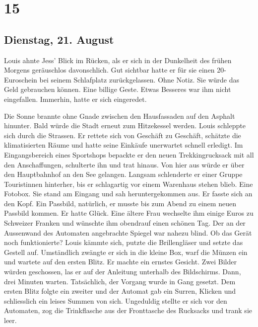 \chapter{15}

\section{Dienstag, 21. August}



Louis ahnte Jess’ Blick im Rücken, als er sich in der Dunkelheit des
frühen Morgens geräuschlos davonschlich.
Gut sichtbar hatte er für sie einen 20-Euroschein bei seinem Schlafplatz
zurückgelassen. Ohne Notiz. Sie würde das Geld gebrauchen können. Eine
billige Geste. Etwas Besseres war ihm nicht eingefallen. Immerhin, hatte
er sich eingeredet. 

\sectionbreak

Die Sonne brannte ohne Gnade zwischen den Hausfassaden auf den Asphalt hinunter. 
Bald würde die Stadt erneut zum Hitzekessel werden. Louis schleppte sich durch die Strassen. Er rettete sich von Geschäft zu Geschäft, schätzte die klimatisierten Räume und hatte seine Einkäufe unerwartet schnell erledigt. Im Eingangsbereich eines Sportshops bepackte er den neuen Trekkingrucksack mit all den Anschaffungen, schulterte ihn und trat hinaus. Von hier aus würde er über den Hauptbahnhof an den See gelangen. Langsam schlenderte er einer Gruppe Touristinnen hinterher, bis er schlagartig vor einem Warenhaus stehen blieb. Eine Fotobox. Sie stand am Eingang und sah heruntergekommen aus. Er fasste sich an den Kopf. Ein Passbild, natürlich, er musste bis zum Abend zu einem neuen Passbild kommen. 
Er hatte Glück. Eine ältere Frau wechselte ihm einige Euros zu Schweizer Franken und wünschte ihm obendrauf einen schönen Tag. Der an der Aussenwand des Automaten angebrachte Spiegel war nahezu blind. Ob das Gerät noch funktionierte? Louis kämmte sich, putzte die Brillengläser und setzte das Gestell auf.
Umständlich zwängte er sich in die kleine Box, warf die Münzen ein und
wartete auf den ersten Blitz. Er machte ein ernstes Gesicht. Zwei Bilder
würden geschossen, las er auf der Anleitung unterhalb des Bildschirms.
Dann, drei Minuten warten. Tatsächlich, der Vorgang wurde in Gang gesetzt. Dem ersten Blitz folgte ein zweiter und der Automat gab ein Surren, Klicken und schliesslich ein leises Summen von sich. Ungeduldig stellte er sich vor den Automaten, zog die Trinkflasche aus der Fronttasche des Rucksacks und trank sie leer.

